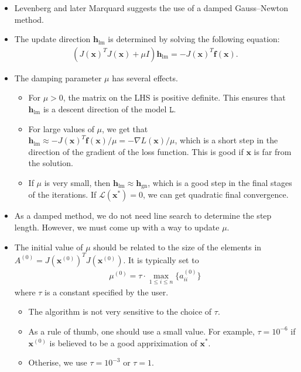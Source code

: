 \documentclass[10pt]{article}
\newcommand{\ve}[1]{\mathbf{#1}}
\newcommand{\mrm}[1]{\mathrm{#1}}
\newcommand{\mcal}[1]{\mathcal{#1}}
\begin{document}
\begin{itemize}
    \item Levenberg \cite{Levenberg:1944} and later Marquard \cite{Marquadrt:1963} suggests the use of a damped Gauss--Newton method.
    
    \item The update direction $\ve{h}_{\mrm{lm}}$ is determined by solving the following equation:
    \begin{align*}
        (J(\ve{x})^TJ(\ve{x}) + \mu I) \ve{h}_{\mrm{lm}} = - J(\ve{x})^T \ve{f}(\ve{x}).
    \end{align*}

    \item The damping parameter $\mu$ has several effects.
    \begin{itemize}
        \item For $\mu > 0$, the matrix on the LHS is positive definite. This ensures that $\ve{h}_{\mrm{lm}}$ is a descent direction of the model $\mathtt{L}$.
        
        \item For large values of $\mu$, we get that $\ve{h}_{\mrm{lm}} \approx - J(\ve{x})^T \ve{f}(\ve{x}) / \mu = - \nabla{L}(\ve{x})/\mu$, which is a short step in the direction of the gradient of the loss function. This is good if $\ve{x}$ is far from the solution.
        
        \item If $\mu$ is very small, then $\ve{h}_{\mrm{lm}} \approx \ve{h}_{\mrm{gn}}$, which is a good step in the final stages of the iterations. If $\mcal{L}(\ve{x}^*) = 0$, we  can get quadratic final convergence.
    \end{itemize}

    \item As a damped method, we do not need line search to determine the step length. However, we must come up with a way to update $\mu$.
    
    \item The initial value of $\mu$ should be related to the size of the elements in $A^{(0)} = J(\ve{x}^{(0)})^T J(\ve{x}^{(0)})$. It is typically set to
    \begin{align*}
        \mu^{(0)} = \tau \cdot \max_{1 \leq i \leq n} \{ a^{(0)}_{ii} \} 
    \end{align*}
    where $\tau$ is a constant specified by the user.
    \begin{itemize}
        \item The algorithm is not very sensitive to the choice of $\tau$.
        \item As a rule of thumb, one should use a small value. For example, $\tau = 10^{-6}$ if $\ve{x}^{(0)}$ is believed to be a good appriximation of $\ve{x}^*$.
        \item Otherise, we use $\tau = 10^{-3}$ or $\tau = 1$.
    \end{itemize}


\end{itemize}
\end{document}

